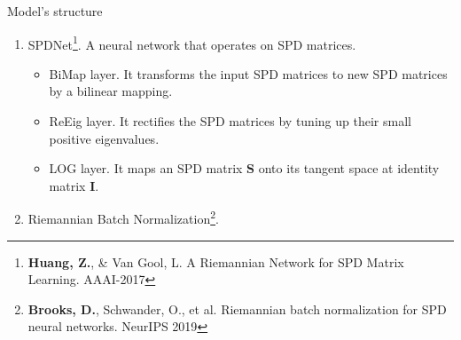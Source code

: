 \documentclass{beamer}
\newcommand\blfootnote[1]{%
	\begingroup
	\renewcommand\thefootnote{}\footnote{#1}%
	\addtocounter{footnote}{-1}%
	\endgroup
}
\begin{document}
\begin{frame}{Model's structure%
		\setcounter{footnote}{0}\footnotemark}


\begin{enumerate}
\item SPDNet\footnote{\tiny{\textbf{Huang, Z.}, \& Van Gool, L. A Riemannian Network for SPD Matrix Learning. AAAI-2017}}. A neural network that operates on SPD matrices.
\begin{itemize}
	\item BiMap layer. It transforms the input SPD matrices to new SPD matrices by a bilinear mapping.
	\item ReEig layer. It rectifies the SPD matrices by tuning up their small positive eigenvalues.
	\item LOG layer. It maps an SPD matrix $\mathbf{S}$ onto its tangent space at identity matrix $\mathbf{I}$.
\end{itemize}

\item Riemannian Batch Normalization\footnote{\tiny{\textbf{Brooks, D.}, Schwander, O., et al. Riemannian batch normalization for SPD neural networks. NeurIPS 2019}}.

\end{enumerate}

\end{frame}

\end{document}
